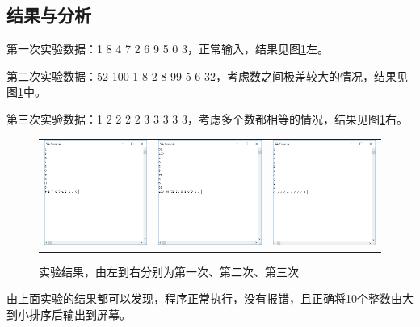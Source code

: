 \documentclass[12pt,UTF8]{ctexart}
\begin{document}
\begin{spacing}{1.1}
\subsection{结果与分析}
\par 第一次实验数据：1 8 4 7 2 6 9 5 0 3，正常输入，结果见图\ref{fig:exp}左。
\par 第二次实验数据：52 100 1 8 2 8 99 5 6 32，考虑数之间极差较大的情况，结果见图\ref{fig:exp}中。
\par 第三次实验数据：1 2 2 2 2 3 3 3 3 3，考虑多个数都相等的情况，结果见图\ref{fig:exp}右。
\begin{figure}[htbp]
	\centering
	\begin{tabular}{ccc}
	\includegraphics[width=0.33\linewidth]{fig/exp_1.PNG}&
	\includegraphics[width=0.33\linewidth]{fig/exp_2.PNG}&
	\includegraphics[width=0.33\linewidth]{fig/exp_3.PNG}
	\end{tabular}
	\caption{实验结果，由左到右分别为第一次、第二次、第三次}
	\label{fig:exp}
\end{figure}
\par 由上面实验的结果都可以发现，程序正常执行，没有报错，且正确将10个整数由大到小排序后输出到屏幕。



\end{spacing}
\end{document}
